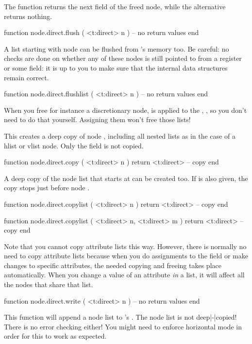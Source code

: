 The  function returns the next field of the freed node, while the
 alternative returns nothing.

\starttyping[option=LUA]
function node.direct.flush ( <t:direct> n )
    -- no return values
end
\stoptyping

A list starting with node  can be flushed from \TEX's memory too. Be
careful: no checks are done on whether any of these nodes is still pointed to
from a register or some  field: it is up to you to make sure that the
internal data structures remain correct.

\starttyping[option=LUA]
function node.direct.flushlist ( <t:direct> n )
    -- no return values
end
\stoptyping

When you free for instance a discretionary node,  is applied to
the , ,  so you don't need to do that
yourself. Assigning them  won't free those lists!

This creates a deep copy of node , including all nested lists as in the case
of a hlist or vlist node. Only the  field is not copied.

\starttyping[option=LUA]
function node.direct.copy ( <t:direct> n )
    return <t:direct> -- copy
end
\stoptyping

A deep copy of the node list that starts at  can be created too. If
 is also given, the copy stops just before node .

\starttyping[option=LUA]
function node.direct.copylist ( <t:direct> n )
    return <t:direct> -- copy
end

function node.direct.copylist ( <t:direct> n, <t:direct> m )
    return <t:direct> -- copy
end
\stoptyping

Note that you cannot copy attribute lists this way. However, there is normally no
need to copy attribute lists because when you do assignments to the 
field or make changes to specific attributes, the needed copying and freeing
takes place automatically. When you change a value of an attribute {\em in} a
list, it will affect all the nodes that share that list.

\starttyping[option=LUA]
function node.direct.write ( <t:direct> n )
    -- no return values
end
\stoptyping

This function will append a node list to \TEX's . The node
list is not deep|-|copied! There is no error checking either! You might need to
enforce horizontal mode in order for this to work as expected.

